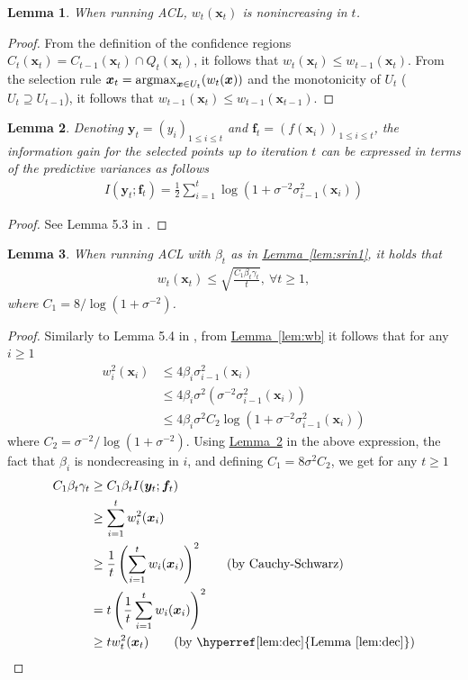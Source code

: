 \documentclass{article}
\def\*#1{\bm{#1}}
\newcommand{\lemmaref}[1]{\hyperref[#1]{\mbox{Lemma~\ref*{#1}}}}
\newcommand{\argmax}{\operatornamewithlimits{argmax}}
\newtheorem{lemma}{Lemma}
\newcommand{\acl}{\textsf{ACL}\xspace}
\begin{document}
\begin{lemma}
\label{lem:dec}
When running \acl, $w_t(\*x_t)$ is nonincreasing in $t$.
\end{lemma}
\begin{proof}
From the definition of the confidence regions
$C_t(\*x_t) = C_{t-1}(\*x_t) \cap Q_t(\*x_t)$, it follows that
$w_t(\*x_t) \leq w_{t-1}(\*x_t)$. From the selection rule
$\*x_t = \argmax_{\*x\in U_t}(w_t(\*x))$ and the monotonicity of
$U_t$ ($U_t \supseteq U_{t-1}$), it follows that
$w_{t-1}(\*x_t) \leq w_{t-1}(\*x_{t-1})$.
\end{proof}

\begin{lemma}
\label{lem:ig}
Denoting $\*y_t = (y_i)_{1\leq i\leq t}$ and
$\*f_t = (f(\*x_i))_{1\leq i\leq t}$,
the information gain for the selected points up to iteration $t$ can be
expressed in terms of the predictive variances as follows
\begin{align*}
I(\*y_t; \*f_t) = \frac{1}{2}\sum_{i=1}^t \log(1 + \sigma^{-2}\sigma_{i-1}^2(\*x_i))
\end{align*}
\end{lemma}
\begin{proof}
See Lemma 5.3 in \cite{srinivas2010}.
\end{proof}

\begin{lemma}
When running \acl with $\beta_t$ as in \lemmaref{lem:srin1}, it holds that
\begin{align*}
w_t(\*x_t) \leq \sqrt{\frac{C_1 \beta_t \gamma_t}{t}},\ \forall t \geq 1,
\end{align*}
where $C_1 = 8 / \log(1 + \sigma^{-2})$.
\end{lemma}
\begin{proof}
Similarly to Lemma 5.4 in \cite{srinivas2010},
from \lemmaref{lem:wb} it follows that for any $i \geq 1$
\begin{align*}
w_i^2(\*x_i) &\leq 4\beta_i\sigma_{i-1}^2(\*x_i)\\
&\leq 4\beta_i\sigma^2(\sigma^{-2}\sigma_{i-1}^2(\*x_i))\\
&\leq 4\beta_i\sigma^2 C_2\log(1 + \sigma^{-2}\sigma_{i-1}^2(\*x_i))
\end{align*}
where $C_2 = \sigma^{-2}/\log(1 + \sigma^{-2})$.
Using \lemmaref{lem:ig} in the above expression, the fact that $\beta_i$
is nondecreasing in $i$, and defining $C_1 = 8\sigma^2C_2$,
we get for any $t \geq 1$
\begin{align*}
C_1\beta_t\gamma_t &\geq C_1\beta_t I(\*y_t; \*f_t)\\
                   &\geq \sum_{i=1}^t w_i^2(\*x_i)\\
                   &\geq \frac{1}{t}\left(\sum_{i=1}^t w_i(\*x_i)\right)^2 \tag*{\textrm{(by Cauchy-Schwarz)}}\\
                   &= t \left(\frac{1}{t}\sum_{i=1}^t w_i(\*x_i)\right)^2\\
                   &\geq t w_t^2(\*x_t) \tag*{\textrm{(by \lemmaref{lem:dec})}}
\end{align*}
\end{proof}
\end{document}
